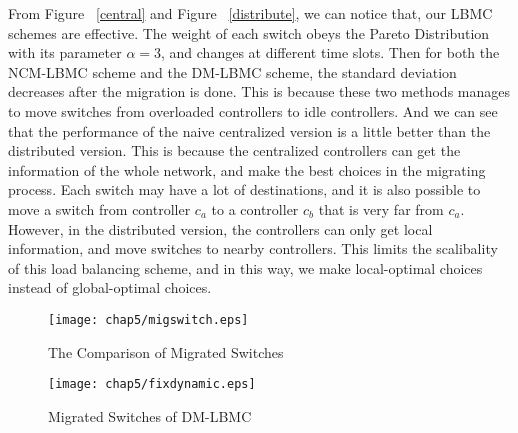 From Figure ~\ref{central} and Figure ~\ref{distribute}, we can notice that, our LBMC schemes are effective. The weight of each switch obeys the Pareto Distribution with its parameter $\alpha=3$, and changes at different time slots. Then for both the NCM-LBMC scheme and the DM-LBMC scheme, the standard deviation decreases after the migration is done. This is because these two methods manages to move switches from overloaded controllers to idle controllers. And we can see that the performance of the naive centralized version is a little better than the distributed version. This is because the centralized controllers can get the information of the whole network, and make the best choices in the migrating process. Each switch may have a lot of destinations, and it is also possible to move a switch from controller $c_a$ to a controller $c_b$ that is very far from $c_a$. However, in the distributed version, the controllers can only get local information, and move switches to nearby controllers. This limits the scalibality of this load balancing scheme, and in this way, we make local-optimal choices instead of global-optimal choices.
\begin{figure}[!htbp]
\begin{minipage}[t]{0.45\textwidth}
    \centering
    \texttt{[image: chap5/migswitch.eps]}
    \caption{The Comparison of Migrated Switches}\label{migswitch}
  \end{minipage}\hspace{0.3cm}
  \begin{minipage}[t]{0.45\textwidth}
    \centering
    \texttt{[image: chap5/fixdynamic.eps]}
    \caption{Migrated Switches of DM-LBMC}\label{fixdynamic}
  \end{minipage}\hspace{0.3cm}
\end{figure}

